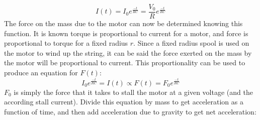\documentclass[12pt,letterpaper]{article}
\begin{document}
\begin{equation}
I(t)=I_0e^\frac{-t}{RC}=\frac{V_0}{R}e^\frac{-t}{RC}
\end{equation}
The force on the mass due to the motor can now be determined knowing this function. It is known torque is proportional to current for a motor, and force is proportional to torque for a fixed radius $r$. Since a fixed radius spool is used on the motor to wind up the string, it can be said the force exerted on the mass by the motor will be proportional to current. This proportionality can be used to produce an equation for $F(t)$:
\begin{equation}
I_0e^\frac{-t}{RC}=I(t)\propto F(t) = F_0e^\frac{-t}{RC}
\end{equation}
$F_0$ is simply the force that it takes to stall the motor at a given voltage (and the according stall current). Divide this equation by mass to get acceleration as a function of time, and then add acceleration due to gravity to get net acceleration:
\end{document}
